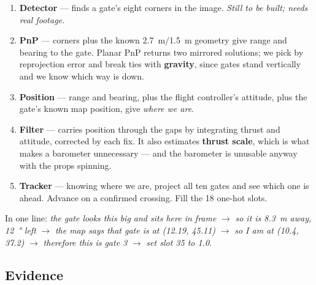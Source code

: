 \begin{enumerate}
\item \textbf{Detector} --- finds a gate's eight corners in the image.
\emph{Still to be built; needs real footage.}
\item \textbf{PnP} --- corners plus the known \SI{2.7}{m}/\SI{1.5}{m} geometry
give range and bearing to the gate. Planar PnP returns two mirrored solutions;
we pick by reprojection error and break ties with \textbf{gravity}, since gates
stand vertically and we know which way is down.
\item \textbf{Position} --- range and bearing, plus the flight controller's
attitude, plus the gate's known map position, give \emph{where we are}.
\item \textbf{Filter} --- carries position through the gaps by integrating thrust
and attitude, corrected by each fix. It also estimates \textbf{thrust scale},
which is what makes a barometer unnecessary --- and the barometer is unusable
anyway with the props spinning.
\item \textbf{Tracker} --- knowing where we are, project all ten gates and see
which one is ahead. Advance on a confirmed crossing. Fill the 18 one-hot slots.
\end{enumerate}

In one line: \emph{the gate looks this big and sits here in frame} $\rightarrow$
\emph{so it is \SI{8.3}{m} away, \SI{12}{\degree} left} $\rightarrow$ \emph{the
map says that gate is at (12.19, 45.11)} $\rightarrow$ \emph{so I am at
(10.4, 37.2)} $\rightarrow$ \emph{therefore this is gate 3} $\rightarrow$
\emph{set slot 35 to 1.0}.

\subsection{Evidence}\label{sec:built}

